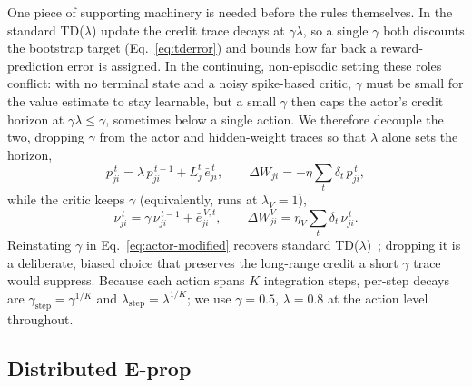 \documentclass[10pt,twocolumn]{article}
\begin{document}
One piece of supporting machinery is needed before the rules themselves. In the
standard TD($\lambda$) update the credit trace decays at $\gamma\lambda$, so a
single $\gamma$ both discounts the bootstrap target (Eq.~\eqref{eq:tderror}) and
bounds how far back a reward-prediction error is assigned. In the continuing,
non-episodic setting these roles conflict: with no terminal state and a noisy
spike-based critic, $\gamma$ must be small for the value estimate to stay
learnable, but a small $\gamma$ then caps the actor's credit horizon at
$\gamma\lambda\le\gamma$, sometimes below a single action. We therefore decouple
the two, dropping $\gamma$ from the actor and hidden-weight traces so that
$\lambda$ alone sets the horizon,
\begin{equation}
p^{\,t}_{ji} = \lambda\, p^{\,t-1}_{ji} + L^t_j\,\bar e^{\,t}_{ji},
\qquad \Delta W_{ji} = -\eta\sum_t \delta_t\, p^{\,t}_{ji},
\label{eq:actor-modified}
\end{equation}
while the critic keeps $\gamma$ (equivalently, runs at $\lambda_V=1$),
\begin{equation}
\nu^{\,t}_{ji} = \gamma\,\nu^{\,t-1}_{ji} + \bar e^{\,V,t}_{ji},
\qquad \Delta W^V_{ji} = \eta_V\sum_t \delta_t\,\nu^{\,t}_{ji}.
\label{eq:critic-modified}
\end{equation}
Reinstating $\gamma$ in Eq.~\eqref{eq:actor-modified} recovers standard
TD($\lambda$)~\citep{SuttonBarto2018}; dropping it is a deliberate, biased choice that preserves the
long-range credit a short $\gamma$ trace would suppress. Because each action
spans $K$ integration steps, per-step decays are
$\gamma_{\mathrm{step}}=\gamma^{1/K}$ and
$\lambda_{\mathrm{step}}=\lambda^{1/K}$; we use $\gamma=0.5$, $\lambda=0.8$
at the action level throughout.

\subsection{Distributed E-prop}
\label{sec:distributed}
\end{document}
